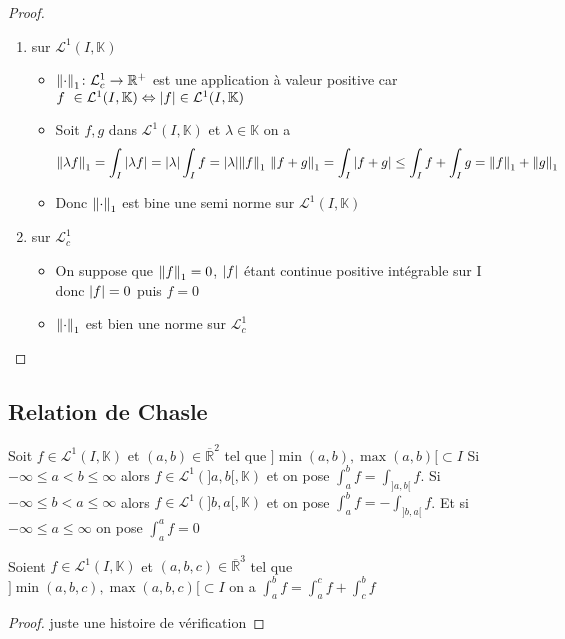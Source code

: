\documentclass[11pt,hidelinks]{book}
\theoremstyle{mytheoremstyle}
\theoremstyle{mytheoremstyle}
\theoremstyle{mytheoremstyle}
\theoremstyle{mytheoremstyle}
\theoremstyle{mytheoremstyle}
\theoremstyle{mytheoremstyle}
\theoremstyle{mytheoremstyle}
\theoremstyle{mytheoremstyle}
\theoremstyle{myproblemstyle}
\def\mbb#1{\mathbb{#1}}
\def\mfc#1{\mathcal{#1}}
\def\bR{\mbb{R}}
\def\L{\mfc{L}^1(I,\bK)}
\def\LI#1{\mfc{L}^1(#1,\bK)}
\def\bK{\mbb{K}}
\newcommand{\func}[3]{#1\colon#2\to#3}
\begin{document}
\begin{adjustwidth}{-2em}{-1em}
\begin{prop}
\begin{proof}
\begin{enumerate}
            \item sur $\L$ \begin{itemize}[label=$\cdot$]
                \item $\func{\norm{\mathord{\cdot}}_1}{\mfc{L}^1_c}{\bR^+}$ est une application à valeur positive car $f \in \L \Leftrightarrow \abs{f} \in \L$
                \item Soit $f,g$ dans $\L$ et $\lambda \in \bK$ on a 
                \begin{equation*}
                    \norm{\lambda f}_1 = \int_{I} \abs{\lambda f} = \abs{\lambda} \int_{I} f = \abs{\lambda} \norm{f}_1 \\ 
                    \norm{f+g}_1 = \int_I \abs{f+g} \leq \int_I f + \int_I g = \norm{f}_1 + \norm{g}_1 \\
                \end{equation*}
                \item Donc $\norm{\mathord{\cdot}}_1$ est bine une semi norme sur $\L$
            \end{itemize}
            \item sur $\mathcal{L}_c^1$ \begin{itemize}
                \item On suppose que $\norm{f}_1 = 0$, $\abs{f}$ étant continue positive intégrable sur I donc $\abs{f} = 0$ puis 
                $f = 0$ 
                \item $\norm{\mathord{\cdot}}_1$ est bien une norme sur $\mathcal{L}^1_c$ 
            \end{itemize}
        \end{enumerate}
        \end{proof}
    \end{prop}
\end{adjustwidth}
\subsection{Relation de Chasle}
\begin{definition}
    Soit $f \in \L$ et $(a,b) \in \overline{\bR}^2$ tel que $]\min(a,b), \max(a,b)[ \subset I$ 
    Si $-\infty \leq a < b \leq \infty$ alors $f \in \LI{]a,b[}
    $ et on pose $\int_{a}^{b} f = \int_{]a,b[} f$. Si $-\infty \leq b < a \leq \infty$ alors $f \in \LI{]b,a[}$ 
    et on pose $\int_{a}^{b} f = - \int_{]b,a[} f$. Et si $-\infty \leq a \leq \infty$ on pose $\int_{a}^{a} f = 0$
\end{definition}
\begin{adjustwidth}{-2em}{-1em}
    \begin{prop}
        Soient $f \in \L$ et $(a,b,c) \in \overline{\bR}^3$ tel que $]\min(a,b,c), \max(a,b,c)[ \subset I$ 
        on a $\int_{a}^{b} f = \int_{a}^{c} f + \int_{c}^{b} f$
    \end{prop}
    \begin{proof}
        juste une histoire de vérification
    \end{proof}
\end{adjustwidth}
\end{document}
